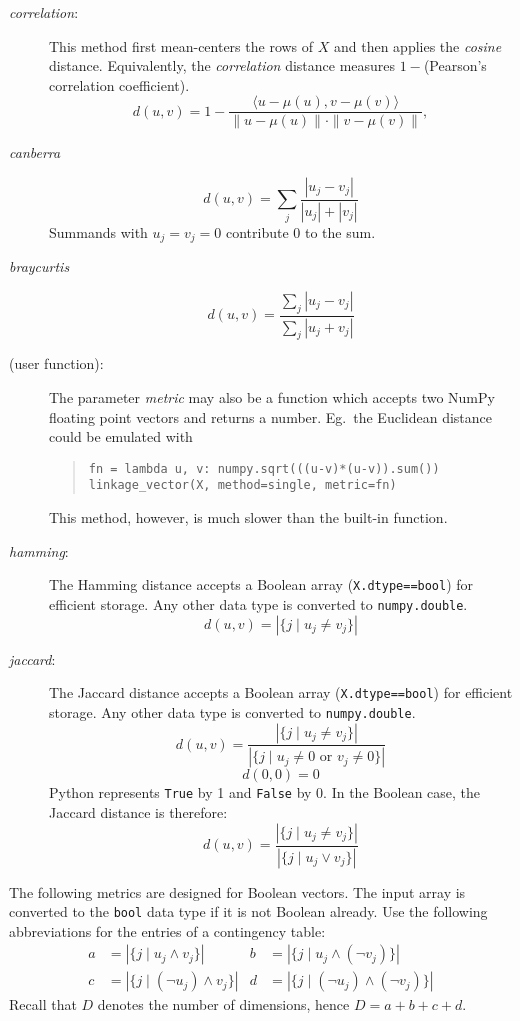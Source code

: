 \documentclass[fontsize=10pt,paper=letter,BCOR=-6mm,DIV=8]{scrartcl}
\makeatletter
\newcommand*\q{\textquotesingle}
\newenvironment{methods}{%
  \list{}{\labelwidth\z@
    \itemindent-\leftmargin
    \let\makelabel\methodslabel}%
}{%
  \endlist
}
\newcommand*{\methodslabel}[1]{%
  \hbox to \textwidth{\hspace{\labelsep}%
  \normalfont\bfseries\ttfamily
  #1\hskip-\labelsep\hfill}%
}
\makeatother
\begin{document}
\begin{methods}
\begin{description}
\item[\normalfont\textit{\q correlation\q}:] This method first mean-centers the rows of $X$ and then applies the \textit{cosine} distance. Equivalently, the \textit{correlation} distance measures $1-{}$\textrm{(Pearson's correlation coefficient)}.
\[
 d(u,v) = 1 - \frac{\langle u-\mu(u),v-\mu(v)\rangle}{\|u-\mu(u)\|\cdot\|v-\mu(v)\|},
\]

\item[\normalfont\textit{\q canberra\q}]
\[
 d(u,v) = \sum_j\frac{|u_j-v_j|}{|u_j|+|v_j|}
\]
Summands with $u_j=v_j=0$ contribute 0 to the sum.

\item[\normalfont\textit{\q braycurtis\q}]
\[
 d(u,v) = \frac{\sum_j |u_j-v_j|}{\sum_j |u_j+v_j|}
\]

\item[\textnormal{(user function):}] The parameter \textit{metric} may also be a function which accepts two NumPy floating point vectors and returns a number. Eg.\ the Euclidean distance could be emulated with
\begin{quote}
\texttt{fn = lambda u, v: numpy.sqrt(((u-v)*(u-v)).sum())}\\
\texttt{linkage\_vector(X, method=\q single\q, metric=fn)}
\end{quote}
This method, however, is much slower than the built-in function.

\item[\normalfont\textit{\q hamming\q}:] The Hamming distance accepts a Boolean array (\texttt{X.\allowbreak dtype\allowbreak ==\allowbreak bool}) for efficient storage. Any other data type is converted to \texttt{numpy.double}.
\[
 d(u,v) = |\{j\mid u_j\neq v_j\}|
\]

\item[\normalfont\textit{\q jaccard\q}:] The Jaccard distance accepts a Boolean array (\texttt{X.dtype\allowbreak ==\allowbreak bool}) for efficient storage. Any other data type is converted to \texttt{numpy.double}.
\[
 d(u,v) = \frac{|\{j\mid u_j\neq v_j\}|}{|\{j\mid u_j\neq 0\text{ or } v_j\neq 0\}|}
\]
\[
 d(0,0) = 0
\]
Python represents \texttt{True} by 1 and \texttt{False} by 0. In the Boolean case, the Jaccard distance is therefore:
\[
 d(u,v) = \frac{|\{j\mid u_j\neq v_j\}|}{|\{j\mid u_j\lor v_j\}|}
\]

\end{description}
The following metrics are designed for Boolean vectors. The input array is converted to the \texttt{bool} data type if it is not Boolean already. Use the following abbreviations for the entries of a contingency table:
\begin{align*}
a &= |\{j\mid u_j\land v_j \}| & b &= |\{j\mid u_j\land(\lnot v_j)\}|\\
c &= |\{j\mid (\lnot u_j)\land v_j \}| & d &= |\{j\mid (\lnot u_j)\land(\lnot v_j)\}|
\end{align*}
Recall that $D$ denotes the number of dimensions, hence $D=a+b+c+d$.



\end{methods}
\end{document}
